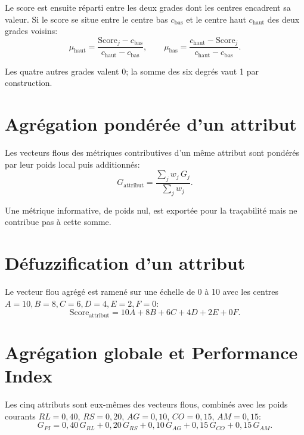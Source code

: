 Le score est ensuite réparti entre les deux grades dont les centres encadrent sa valeur. Si le score se situe entre le centre bas $c_{\mathrm{bas}}$ et le centre haut $c_{\mathrm{haut}}$ des deux grades voisins:
\begin{equation}
\mu_{\mathrm{haut}} = \frac{\mathrm{Score}_j - c_{\mathrm{bas}}}{c_{\mathrm{haut}} - c_{\mathrm{bas}}}, \qquad
\mu_{\mathrm{bas}} = \frac{c_{\mathrm{haut}} - \mathrm{Score}_j}{c_{\mathrm{haut}} - c_{\mathrm{bas}}}.
\label{eq:fuzzification}
\end{equation}

Les quatre autres grades valent 0; la somme des six degrés vaut 1 par construction.

\section{Agrégation pondérée d'un attribut}

Les vecteurs flous des métriques contributives d'un même attribut sont pondérés par leur poids local puis additionnés:
\begin{equation}
G_{\mathrm{attribut}} = \frac{\sum_j w_j \, G_j}{\sum_j w_j}.
\label{eq:aggregation-attribut}
\end{equation}

Une métrique informative, de poids nul, est exportée pour la traçabilité mais ne contribue pas à cette somme.

\section{Défuzzification d'un attribut}

Le vecteur flou agrégé est ramené sur une échelle de 0 à 10 avec les centres $A=10, B=8, C=6, D=4, E=2, F=0$:
\begin{equation}
\mathrm{Score}_{\mathrm{attribut}} = 10A + 8B + 6C + 4D + 2E + 0F.
\label{eq:defuzzification-attribut}
\end{equation}

\section{Agrégation globale et Performance Index}

Les cinq attributs sont eux-mêmes des vecteurs flous, combinés avec les poids courants $RL=0{,}40$, $RS=0{,}20$, $AG=0{,}10$, $CO=0{,}15$, $AM=0{,}15$:
\begin{equation}
G_{PI} = 0{,}40\,G_{RL} + 0{,}20\,G_{RS} + 0{,}10\,G_{AG} + 0{,}15\,G_{CO} + 0{,}15\,G_{AM}.
\label{eq:vecteur-pi}
\end{equation}

